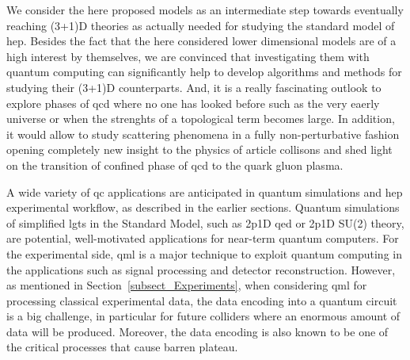 We consider the here proposed models as an intermediate step towards eventually reaching (3+1)D theories as actually needed  for studying the standard model of \gls{hep}. Besides the fact that the here considered lower dimensional models are of a high interest by themselves, we are convinced that investigating them with quantum computing can significantly help to develop algorithms and methods for studying their (3+1)D counterparts. And, it is a really fascinating outlook to explore phases of \gls{qcd} where no one has looked before such as the very eaerly universe or when the strenghts of a topological term becomes large. In addition, it would allow to study scattering phenomena in a fully non-perturbative fashion opening completely new insight to the physics of article collisons and shed light on the transition of confined phase of \gls{qcd} to the quark gluon plasma. 

A wide variety of \gls{qc} applications are anticipated in quantum simulations and \gls{hep} experimental workflow, as described in the earlier sections. Quantum simulations of simplified \gls{lgt}s in the Standard Model, such as \gls{2p1D} \gls{qed} or \gls{2p1D} SU(2) theory, are potential, well-motivated applications for near-term quantum computers. For the experimental side, \gls{qml} is a major technique to exploit quantum computing in the applications such as signal processing and detector reconstruction. 
However, as mentioned in Section~\ref{subsect_Experiments}, when considering \gls{qml} for processing classical experimental data, the data encoding into a quantum circuit is a big challenge, in particular for future colliders where an enormous amount of data will be produced. Moreover, the data encoding is also known to be one of the critical processes that cause barren plateau. 

